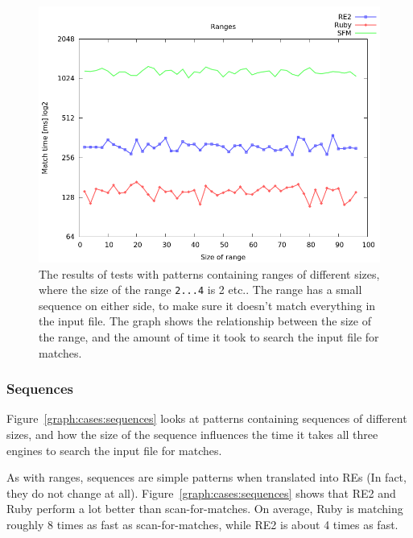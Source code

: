 \documentclass[12pt]{article}
\theoremstyle{definition}
\begin{document}
\begin{figure}[H]
	\begin{center}
		\includegraphics[scale=0.55]{graphs/ranges.png}	
	\end{center}
	\caption{The results of tests with patterns containing ranges of different sizes, where the size of the range \texttt{2...4} is 2 etc.. The range has a small sequence on either side, to make sure it doesn't match everything in the input file. The graph shows the relationship between the size of the range, and the amount of time it took to search the input file for matches.}
	\label{graph:cases:ranges}
\end{figure}


\subsubsection{Sequences}

Figure~\ref{graph:cases:sequences} looks at patterns containing sequences of different sizes, and how the size of the sequence influences the time it takes all three engines to search the input file for matches.

As with ranges, sequences are simple patterns when translated into REs (In fact, they do not change at all). Figure~\ref{graph:cases:sequences} shows that RE2 and Ruby perform a lot better than scan-for-matches. On average, Ruby is matching roughly 8 times as fast as scan-for-matches, while RE2 is about 4 times as fast.
\end{document}
